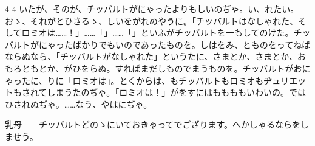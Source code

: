 \documentclass[tate,paper=b6j,jafontsize=9pt]{jlreq}
\begin{document}
\begin{azconvIndented}{4\zw}{-4\zw}
いたが、そのが、チッバルトがにゃったよりもしいのぢゃ。い、れたい。おゝ、それがとひさるゝ、しいをがれぬやうに。「チッバルトはなしゃれた、そしてロミオは……！」……「」……「」といふがチッバルトを一もしてのけた。チッバルトがにゃったばかりでもいのであったものを。しはをみ、とものをってねばならぬなら、「チッバルトがなしゃれた」というたに、さまとか、さまとか、おもろともとか、がひをらぬ。すればまだしものでまうものを。チッバルトがおにゃったに、りに「ロミオは」。とくからは、もチッバルトもロミオもヂュリエットもされてしまうたのぢゃ。「ロミオは！」がをすにはももももいわいの。ではひされぬぢゃ。……なう、やはにぢゃ。

乳母　　チッバルトどのゝにいておきゃってでござります。へかしゃるならをしませう。


\end{azconvIndented}
\end{document}
